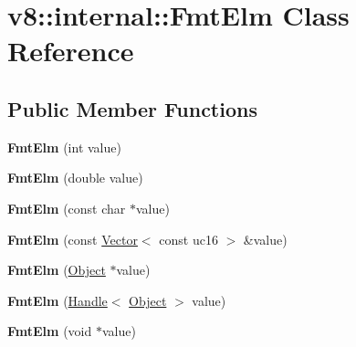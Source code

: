 \hypertarget{classv8_1_1internal_1_1_fmt_elm}{}\section{v8\+:\+:internal\+:\+:Fmt\+Elm Class Reference}
\label{classv8_1_1internal_1_1_fmt_elm}
\subsection*{Public Member Functions}
\begin{DoxyCompactItemize}
\item 
{\bfseries Fmt\+Elm} (int value)\hypertarget{classv8_1_1internal_1_1_fmt_elm_a90a1e13e5eda667fff8956df35b26ca6}{}\label{classv8_1_1internal_1_1_fmt_elm_a90a1e13e5eda667fff8956df35b26ca6}

\item 
{\bfseries Fmt\+Elm} (double value)\hypertarget{classv8_1_1internal_1_1_fmt_elm_ac47f59b4926633bb1f045a8216b58b8c}{}\label{classv8_1_1internal_1_1_fmt_elm_ac47f59b4926633bb1f045a8216b58b8c}

\item 
{\bfseries Fmt\+Elm} (const char $\ast$value)\hypertarget{classv8_1_1internal_1_1_fmt_elm_ab9d6ef1b798135e92f244b3916b08fa3}{}\label{classv8_1_1internal_1_1_fmt_elm_ab9d6ef1b798135e92f244b3916b08fa3}

\item 
{\bfseries Fmt\+Elm} (const \hyperlink{classv8_1_1internal_1_1_vector}{Vector}$<$ const uc16 $>$ \&value)\hypertarget{classv8_1_1internal_1_1_fmt_elm_a121ede6cf29433d1a517d4f6f3e08157}{}\label{classv8_1_1internal_1_1_fmt_elm_a121ede6cf29433d1a517d4f6f3e08157}

\item 
{\bfseries Fmt\+Elm} (\hyperlink{classv8_1_1internal_1_1_object}{Object} $\ast$value)\hypertarget{classv8_1_1internal_1_1_fmt_elm_a9f50a14d694aa1684596913ba27f6aad}{}\label{classv8_1_1internal_1_1_fmt_elm_a9f50a14d694aa1684596913ba27f6aad}

\item 
{\bfseries Fmt\+Elm} (\hyperlink{classv8_1_1internal_1_1_handle}{Handle}$<$ \hyperlink{classv8_1_1internal_1_1_object}{Object} $>$ value)\hypertarget{classv8_1_1internal_1_1_fmt_elm_a1c1405c33943beb1aa98d97b82e3f82f}{}\label{classv8_1_1internal_1_1_fmt_elm_a1c1405c33943beb1aa98d97b82e3f82f}

\item 
{\bfseries Fmt\+Elm} (void $\ast$value)\hypertarget{classv8_1_1internal_1_1_fmt_elm_a8cdabafd70bb2ca4c20f38bf4c85ad54}{}\label{classv8_1_1internal_1_1_fmt_elm_a8cdabafd70bb2ca4c20f38bf4c85ad54}

\end{DoxyCompactItemize}
